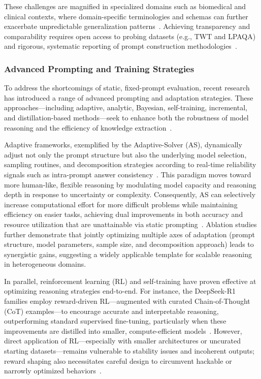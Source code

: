 \documentclass[sigconf]{acmart}
\begin{document}
These challenges are magnified in specialized domains such as biomedical and clinical contexts, where domain-specific terminologies and schemas can further exacerbate unpredictable generalization patterns~\cite{ref94,ref95}. Achieving transparency and comparability requires open access to probing datasets (e.g., TWT and LPAQA) and rigorous, systematic reporting of prompt construction methodologies~\cite{ref96,ref98}.

\subsubsection{Advanced Prompting and Training Strategies}

To address the shortcomings of static, fixed-prompt evaluation, recent research has introduced a range of advanced prompting and adaptation strategies. These approaches---including adaptive, analytic, Bayesian, self-training, incremental, and distillation-based methods---seek to enhance both the robustness of model reasoning and the efficiency of knowledge extraction~\cite{ref1,ref4,ref6,ref49,ref56,ref57,ref68,ref86,ref103}.

Adaptive frameworks, exemplified by the Adaptive-Solver (AS), dynamically adjust not only the prompt structure but also the underlying model selection, sampling routines, and decomposition strategies according to real-time reliability signals such as intra-prompt answer consistency~\cite{ref57}. This paradigm moves toward more human-like, flexible reasoning by modulating model capacity and reasoning depth in response to uncertainty or complexity. Consequently, AS can selectively increase computational effort for more difficult problems while maintaining efficiency on easier tasks, achieving dual improvements in both accuracy and resource utilization that are unattainable via static prompting~\cite{ref57}. Ablation studies further demonstrate that jointly optimizing multiple axes of adaptation (prompt structure, model parameters, sample size, and decomposition approach) leads to synergistic gains, suggesting a widely applicable template for scalable reasoning in heterogeneous domains.

In parallel, reinforcement learning (RL) and self-training have proven effective at optimizing reasoning strategies end-to-end. For instance, the DeepSeek-R1 families employ reward-driven RL---augmented with curated Chain-of-Thought (CoT) examples---to encourage accurate and interpretable reasoning, outperforming standard supervised fine-tuning, particularly when these improvements are distilled into smaller, compute-efficient models~\cite{ref56,ref103}. However, direct application of RL---especially with smaller architectures or uncurated starting datasets---remains vulnerable to stability issues and incoherent outputs; reward shaping also necessitates careful design to circumvent hackable or narrowly optimized behaviors~\cite{ref56,ref103}.
\end{document}
